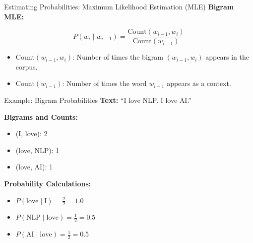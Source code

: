 \begin{frame}{Estimating Probabilities: Maximum Likelihood Estimation (MLE)}
    \textbf{Bigram MLE:}

    \[
        P(w_i \mid w_{i-1}) = \frac{\text{Count}(w_{i-1}, w_i)}{\text{Count}(w_{i-1})}
    \]

    \begin{itemize}
        \item $\text{Count}(w_{i-1}, w_i)$: Number of times the bigram $(w_{i-1}, w_i)$ appears in the corpus.
        \item $\text{Count}(w_{i-1})$: Number of times the word $w_{i-1}$ appears as a context.
    \end{itemize}
\end{frame}

\begin{frame}{Example: Bigram Probabilities}
    \textbf{Text:} ``I love NLP. I love AI.''

    \vspace{1em}
    \textbf{Bigrams and Counts:}
    \begin{itemize}
        \item (I, love): 2
        \item (love, NLP): 1
        \item (love, AI): 1
    \end{itemize}

    \vspace{1em}
    \textbf{Probability Calculations:}
    \begin{itemize}
        \item $P(\text{love} \mid \text{I}) = \frac{2}{2} = 1.0$
        \item $P(\text{NLP} \mid \text{love}) = \frac{1}{2} = 0.5$
        \item $P(\text{AI} \mid \text{love}) = \frac{1}{2} = 0.5$
    \end{itemize}
\end{frame}